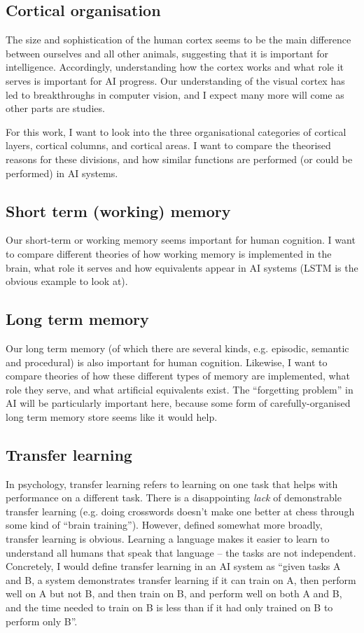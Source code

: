 \documentclass[10pt,a4paper]{article}
\newcommand{\nquote}[1]{``{#1}''}
\begin{document}
\subsection{Cortical organisation}
The size and sophistication of the human cortex seems to be the main difference between ourselves and all other animals, suggesting that it is important for intelligence. Accordingly, understanding how the cortex works and what role it serves is important for AI progress. Our understanding of the visual cortex has led to breakthroughs in computer vision, and I expect many more will come as other parts are studies.

For this work, I want to look into the three organisational categories of cortical layers, cortical columns, and cortical areas. I want to compare the theorised reasons for these divisions, and how similar functions are performed (or could be performed) in AI systems.

\subsection{Short term (working) memory}
Our short-term or working memory seems important for human cognition. I want to compare different theories of how working memory is implemented in the brain, what role it serves and how equivalents appear in AI systems (LSTM is the obvious example to look at).

\subsection{Long term memory}
Our long term memory (of which there are several kinds, e.g. episodic, semantic and procedural) is also important for human cognition. Likewise, I want to compare theories of how these different types of memory are implemented, what role they serve, and what artificial equivalents exist. The \nquote{forgetting problem} in AI will be particularly important here, because some form of carefully-organised long term memory store seems like it would help.

\subsection{Transfer learning}
In psychology, transfer learning refers to learning on one task that helps with performance on a different task. There is a disappointing \emph{lack} of demonstrable transfer learning (e.g. doing crosswords doesn't make one better at chess through some kind of \nquote{brain training}). However, defined somewhat more broadly, transfer learning is obvious. Learning a language makes it easier to learn to understand all humans that speak that language -- the tasks are not independent. Concretely, I would define transfer learning in an AI system as \nquote{given tasks A and B, a system demonstrates transfer learning if it can train on A, then perform well on A but not B, and then train on B, and perform well on both A and B, and the time needed to train on B is less than if it had only trained on B to perform only B}.
\end{document}
